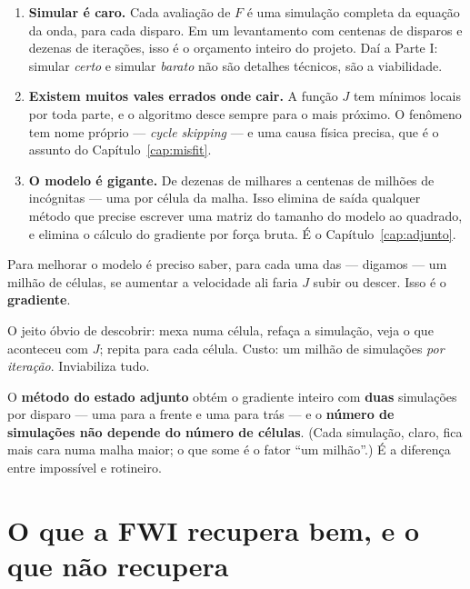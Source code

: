\documentclass[11pt,a4paper,oneside]{report}
\begin{document}
\begin{enumerate}[leftmargin=*]
\item \textbf{Simular \'e caro.} Cada avalia\c{c}\~ao de $F$ \'e uma
simula\c{c}\~ao completa da equa\c{c}\~ao da onda, para cada disparo. Em um
levantamento com centenas de disparos e dezenas de itera\c{c}\~oes, isso \'e
o or\c{c}amento inteiro do projeto. Da\'i a Parte I: simular \emph{certo} e
simular \emph{barato} n\~ao s\~ao detalhes t\'ecnicos, s\~ao a
viabilidade.

\item \textbf{Existem muitos vales errados onde cair.} A fun\c{c}\~ao
$J$ tem m\'inimos locais por toda parte, e o algoritmo desce sempre para o
mais pr\'oximo. O fen\^omeno tem nome pr\'oprio --- \emph{cycle skipping} ---
e uma causa f\'isica precisa, que \'e o assunto do Cap\'itulo~\ref{cap:misfit}.

\item \textbf{O modelo \'e gigante.} De dezenas de milhares a centenas de
milh\~oes de inc\'ognitas --- uma por c\'elula da malha. Isso elimina de
sa\'ida qualquer m\'etodo que precise escrever uma matriz do tamanho do
modelo ao quadrado, e elimina o c\'alculo do gradiente por for\c{c}a bruta.
\'E o Cap\'itulo~\ref{cap:adjunto}.
\end{enumerate}

\begin{teoria}
Para melhorar o modelo \'e preciso saber, para cada uma das --- digamos ---
um milh\~ao de c\'elulas, se aumentar a velocidade ali faria $J$ subir ou
descer. Isso \'e o \textbf{gradiente}.

O jeito \'obvio de descobrir: mexa numa c\'elula, refa\c{c}a a
simula\c{c}\~ao, veja o que aconteceu com $J$; repita para cada c\'elula.
Custo: um milh\~ao de simula\c{c}\~oes \emph{por itera\c{c}\~ao}.
Inviabiliza tudo.

O \textbf{m\'etodo do estado adjunto} obt\'em o gradiente inteiro com
\textbf{duas} simula\c{c}\~oes por disparo --- uma para a frente e uma para
tr\'as --- e o \textbf{n\'umero de simula\c{c}\~oes n\~ao depende do n\'umero
de c\'elulas}. (Cada simula\c{c}\~ao, claro, fica mais cara numa malha maior;
o que some \'e o fator ``um milh\~ao''.) \'E a diferen\c{c}a entre imposs\'ivel e
rotineiro.
\end{teoria}

\section{O que a FWI recupera bem, e o que n\~ao recupera}
\end{document}
